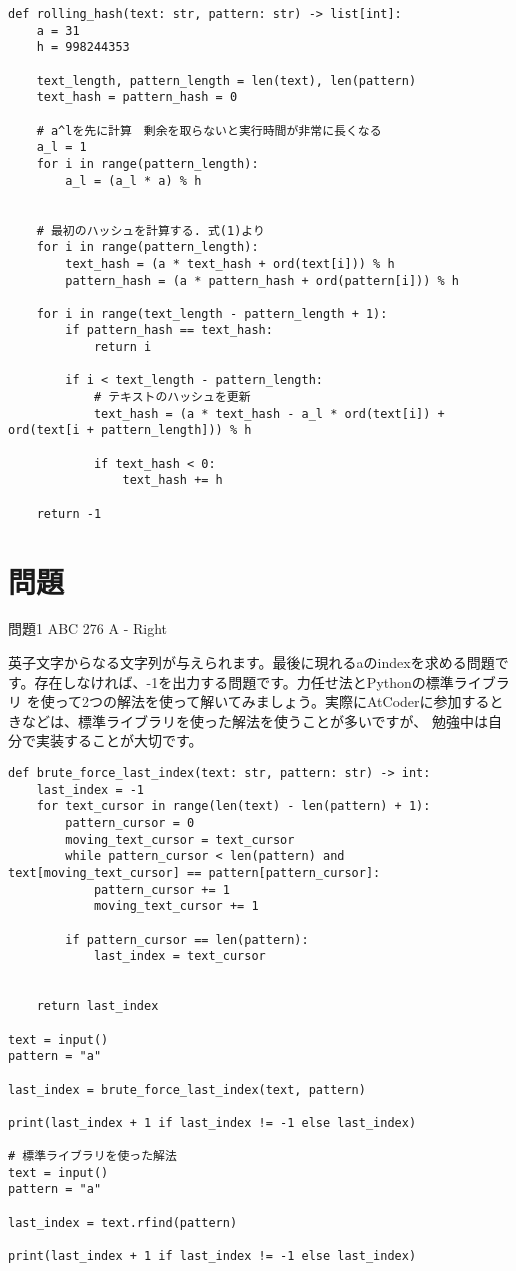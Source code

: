\documentclass{jlreq}
\begin{document}
\begin{lstlisting}[caption=ラビン・カープ法の実装, frame=TRBL, label={Rabin-Karp}]
def rolling_hash(text: str, pattern: str) -> list[int]:
    a = 31
    h = 998244353
    
    text_length, pattern_length = len(text), len(pattern)
    text_hash = pattern_hash = 0
    
    # a^lを先に計算　剰余を取らないと実行時間が非常に長くなる
    a_l = 1
    for i in range(pattern_length):
        a_l = (a_l * a) % h
    
    
    # 最初のハッシュを計算する. 式(1)より
    for i in range(pattern_length):
        text_hash = (a * text_hash + ord(text[i])) % h
        pattern_hash = (a * pattern_hash + ord(pattern[i])) % h
    
    for i in range(text_length - pattern_length + 1):
        if pattern_hash == text_hash:
            return i
        
        if i < text_length - pattern_length:
            # テキストのハッシュを更新
            text_hash = (a * text_hash - a_l * ord(text[i]) + ord(text[i + pattern_length])) % h
        
            if text_hash < 0:
                text_hash += h
    
    return -1
\end{lstlisting}

\section{問題}

問題1 ABC 276 A - Right

英子文字からなる文字列が与えられます。最後に現れるaのindexを求める問題です。存在しなければ、-1を出力する問題です。力任せ法とPythonの標準ライブラリ
を使って2つの解法を使って解いてみましょう。実際にAtCoderに参加するときなどは、標準ライブラリを使った解法を使うことが多いですが、
勉強中は自分で実装することが大切です。

\begin{lstlisting}[caption=問題1の解答, frame=TRBL, label={problem1}]
def brute_force_last_index(text: str, pattern: str) -> int:
    last_index = -1
    for text_cursor in range(len(text) - len(pattern) + 1):
        pattern_cursor = 0
        moving_text_cursor = text_cursor
        while pattern_cursor < len(pattern) and text[moving_text_cursor] == pattern[pattern_cursor]:
            pattern_cursor += 1
            moving_text_cursor += 1
        
        if pattern_cursor == len(pattern):
            last_index = text_cursor
        
    
    return last_index

text = input()
pattern = "a"

last_index = brute_force_last_index(text, pattern)

print(last_index + 1 if last_index != -1 else last_index)

# 標準ライブラリを使った解法
text = input()
pattern = "a"

last_index = text.rfind(pattern)

print(last_index + 1 if last_index != -1 else last_index)
\end{lstlisting}
\end{document}
